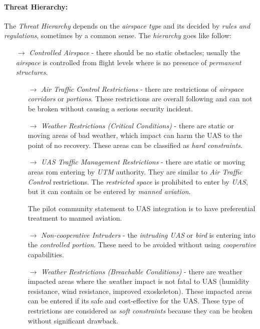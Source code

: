 \paragraph{Threat Hierarchy:} The \emph{Threat Hierarchy} depends on the \emph{airspace type} and its decided by \emph{rules and regulations}, sometimes by a common sense. The \emph{hierarchy} goes like follow:

\begin{itemize}
    \item[$\to$] \emph{Controlled Airspace} - there should be no static obstacles; usually the \emph{airspace} is controlled from flight levels where is no presence of \emph{permanent structures}.
        \begin{itemize}
            \item[$\to$] \emph{Air Traffic Control Restrictions} - there are restrictions of \emph{airspace corridors} or \emph{portions}. These restrictions are overall following and can not be broken without causing a serious security incident.
            
            \item[$\to$] \emph{Weather Restrictions (Critical Conditions)} - there are static or moving areas of bad weather, which impact can harm the UAS to the point of no recovery. These areas can be classified as \emph{hard constraints}.  
            
            \item[$\to$] \emph{UAS Traffic Management Restrictions} - there are static or moving  areas rom entering by \emph{UTM} authority.  They are similar to \emph{Air Traffic Control} restrictions. The \emph{restricted space} is prohibited to enter by \emph{UAS}, but it can contain or be entered by \emph{manned aviation}.
            \begin{note}
                The pilot community statement to UAS integration is to have preferential treatment to manned aviation.
            \end{note}      
            
            
            \item[$\to$] \emph{Non-cooperative Intruders} - the \emph{intruding UAS} or \emph{bird} is entering into the \emph{controlled portion}. These need to be avoided without using \emph{cooperative} capabilities.
            
            \item[$\to$] \emph{Weather Restrictions (Breachable Conditions)} - there are weather impacted areas where the \emph weather impact is not fatal to UAS (humidity resistance, wind resistance, improved exoskeleton). These impacted areas can be entered if its safe and cost-effective for the UAS. These type of restrictions are considered as \emph{soft constraints} because they can be broken without significant drawback. 
        \end{itemize}
        

\end{itemize}
